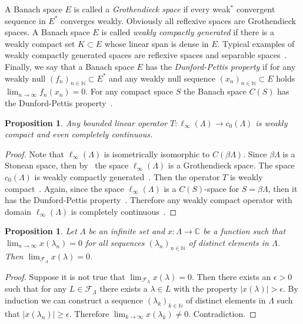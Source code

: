 \documentclass[12pt]{article}
\newtheorem{proposition}[theorem]{Proposition}
\begin{document}
A Banach space $E$ is called a \textit{Grothendieck space} if every weak$^*$
convergent sequence in $E^*$ converges weakly. Obviously all reflexive spaces
are Grothendieck spaces. A Banach space $E$ is called \textit{weakly compactly
    generated} if there is a weakly compact set $K\subset E$ whose linear span is
dense in $E$. Typical examples of weakly compactly generated spaces are
reflexive spaces and separable spaces~\cite[paragraph 13.1]{FabHabBanSpTh}.
Finally, we say that a Banach space $E$ has the \textit{Dunford-Pettis property}
if for any weakly null ${(f_n)}_{n\in\mathbb{N}}\subset E^*$ and any weakly null
sequence ${(x_n)}_{n\in\mathbb{N}}\subset E$ holds $\lim_{n\to\infty}
    f_n(x_n)=0$. For any compact space $S$ the Banach space $C(S)$ has the
Dunford-Pettis property~\cite{DunfPetLinOpSumFunc}.

\begin{proposition}\label{OpLInfc0CompContWeakComp} Any bounded linear operator
    $T:\ell_\infty(\Lambda)\to c_0(\Lambda)$ is weakly compact and even
    completely continuous.
\end{proposition}
\begin{proof} Note that $\ell_\infty(\Lambda)$ is isometrically isomorphic to
    $C(\beta\Lambda)$. Since $\beta\Lambda$ is a Stonean space, then
    by~\cite[theorem 9, p. 168]{GrothApplFabilCompCK} the space
    $\ell_\infty(\Lambda)$ is a Grothendieck space. The space $c_0(\Lambda)$ is
    weakly compactly generated~\cite[paragraph 13.1 example
        (iii)]{FabHabBanSpTh}. Then the operator $T$ is weakly
    compact~\cite[exercise 13.33]{FabHabBanSpTh}. Again, since the space
    $\ell_\infty(\Lambda)$ is a $C(S)$-space for $S=\beta\Lambda$, then it has
    the Dunford-Pettis property~\cite[theorem 13.43]{FabHabBanSpTh}. Therefore
    any weakly compact operator with domain $\ell_\infty(\Lambda)$ is completely
    continuous~\cite[proposition 13.42]{FabHabBanSpTh}.
\end{proof}

\begin{proposition}\label{FrechFiltConvCharac} Let $\Lambda$ be an infinite set
    and $x:\Lambda\to\mathbb{C}$ be a function such that $\lim_{n\to\infty}
        x(\lambda_n)=0$ for all sequences ${(\lambda_n)}_{n\in\mathbb{N}}$ of
    distinct elements in $\Lambda$. Then
    $\lim_{\mathcal{F}_{\Lambda}}x(\lambda)=0$.
\end{proposition}
\begin{proof} Suppose it is not true that
    $\lim_{\mathcal{F}_{\Lambda}}x(\lambda)=0$. Then there exists an $\epsilon >
        0$ such that for any $L\in\mathcal{F}_{\Lambda}$ there exists a $\lambda\in
        L$ with the property $|x(\lambda)|>\epsilon$. By induction we can construct
    a sequence ${(\lambda_k)}_{k\in\mathbb{N}}$ of distinct elements in
    $\Lambda$ such that $|x(\lambda_n)|\geq \epsilon$. Therefore
    $\lim_{k\to\infty} x(\lambda_k)\neq 0$. Contradiction.
\end{proof}
\end{document}
